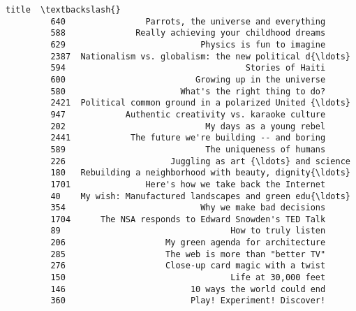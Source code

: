 \documentclass[11pt]{article}
\begin{document}
\begin{Verbatim}[commandchars=\\\{\}]
                                                           title  \textbackslash{}
         640                Parrots, the universe and everything   
         588              Really achieving your childhood dreams   
         629                           Physics is fun to imagine   
         2387  Nationalism vs. globalism: the new political d{\ldots}   
         594                                    Stories of Haiti   
         600                          Growing up in the universe   
         580                       What's the right thing to do?   
         2421  Political common ground in a polarized United {\ldots}   
         947            Authentic creativity vs. karaoke culture   
         202                            My days as a young rebel   
         2441            The future we're building -- and boring   
         589                            The uniqueness of humans   
         226                     Juggling as art {\ldots} and science   
         180   Rebuilding a neighborhood with beauty, dignity{\ldots}   
         1701               Here's how we take back the Internet   
         40    My wish: Manufactured landscapes and green edu{\ldots}   
         354                           Why we make bad decisions   
         1704      The NSA responds to Edward Snowden's TED Talk   
         89                                  How to truly listen   
         206                    My green agenda for architecture   
         285                    The web is more than "better TV"   
         276                    Close-up card magic with a twist   
         150                                 Life at 30,000 feet   
         146                         10 ways the world could end   
         360                         Play! Experiment! Discover!   
         

\end{Verbatim}
\end{document}
